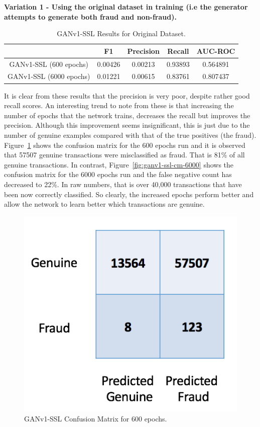 \documentclass[12pt,a4paper,twoside]{report}
\begin{document}
\textbf{Variation 1 - Using the original dataset in training (i.e the generator attempts to generate both fraud and non-fraud).}

\begin{table}[H]  
  \centering
  \begin{tabular}{ccccc}
    \toprule
           		& F1 & Precision & Recall & AUC-ROC \\ \midrule
    GANv1-SSL (600 epochs) & 0.00426  &  0.00213 & 0.93893  & 0.564891 \\
    GANv1-SSL (6000 epochs) & 0.01221   &   0.00615 & 0.83761 & 0.807437  \\
   
   \bottomrule
 \end{tabular}
 \caption{GANv1-SSL Results for Original Dataset.}
\label{table:ganv1-ssl-original}
\end{table}

It is clear from these results that the precision is very poor, despite rather good recall scores. An interesting trend to note from these is that increasing the number of epochs that the network trains, decreases the recall but improves the precision. Although this improvement seems insignificant, this is just due to the number of genuine examples compared with that of the true positives (the fraud). Figure~\ref{fig:ganv1-ssl-cm-600} shows the confusion matrix for the 600 epochs run and it is observed that 57507 genuine transactions were misclassified as fraud. That is 81\% of all genuine transactions. In contrast, Figure~\ref{fig:ganv1-ssl-cm-6000} shows the confusion matrix for the 6000 epochs run and the false negative count has decreased to 22\%. In raw numbers, that is over 40,000 transactions that have been now correctly classified. So clearly, the increased epochs perform better and allow the network to learn better which transactions are genuine. 

\begin{figure}[H]
\centering
\includegraphics[scale=0.6]{ganv1-ssl-cm-600}
\caption{GANv1-SSL Confusion Matrix for 600 epochs.}
\label{fig:ganv1-ssl-cm-600}
\end{figure}
\end{document}
